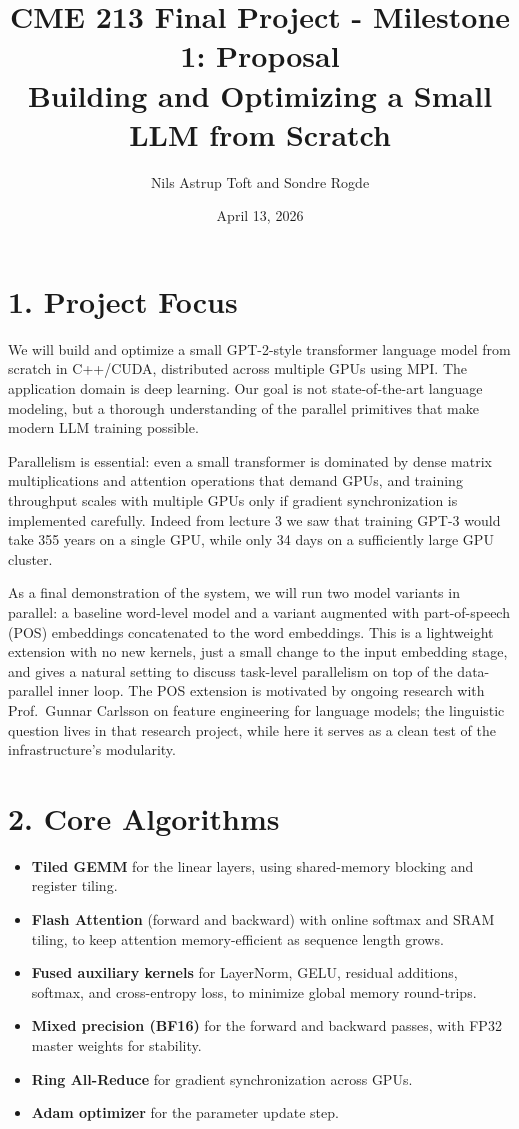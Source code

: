 \documentclass[11pt]{article}
\title{\vspace{-3em}CME 213 Final Project - Milestone 1: Proposal\\
\large Building and Optimizing a Small LLM from Scratch}
\author{Nils Astrup Toft \quad and \quad Sondre Rogde}
\date{April 13, 2026}
\begin{document}
\maketitle
\vspace{-2.5em}

\section*{1. Project Focus}

We will build and optimize a small GPT-2-style transformer language model from scratch in C++/CUDA, distributed across multiple GPUs using MPI. The application domain is deep learning. Our goal is not state-of-the-art language modeling, but a thorough understanding of the parallel primitives that make modern LLM training possible.

Parallelism is essential: even a small transformer is dominated by dense matrix multiplications and attention operations that demand GPUs, and training throughput scales with multiple GPUs only if gradient synchronization is implemented carefully. Indeed from lecture 3 we saw that training GPT-3 would take 355 years on a single GPU, while only 34 days on a sufficiently large GPU cluster. 

As a final demonstration of the system, we will run two model variants in parallel: a baseline word-level model and a variant augmented with part-of-speech (POS) embeddings concatenated to the word embeddings. This is a lightweight extension with no new kernels, just a small change to the input embedding stage, and gives a natural setting to discuss task-level parallelism on top of the data-parallel inner loop. The POS extension is motivated by ongoing research with Prof.\ Gunnar Carlsson on feature engineering for language models; the linguistic question lives in that research project, while here it serves as a clean test of the infrastructure's modularity.

\section*{2. Core Algorithms}

\begin{itemize}
    \item \textbf{Tiled GEMM} for the linear layers, using shared-memory blocking and register tiling.
    \item \textbf{Flash Attention} (forward and backward) with online softmax and SRAM tiling, to keep attention memory-efficient as sequence length grows.
    \item \textbf{Fused auxiliary kernels} for LayerNorm, GELU, residual additions, softmax, and cross-entropy loss, to minimize global memory round-trips.
    \item \textbf{Mixed precision (BF16)} for the forward and backward passes, with FP32 master weights for stability.
    \item \textbf{Ring All-Reduce} for gradient synchronization across GPUs.
    \item \textbf{Adam optimizer} for the parameter update step.
\end{itemize}
\end{document}
